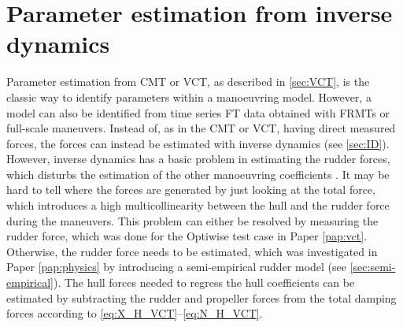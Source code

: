 \section{Parameter estimation from inverse dynamics} \label{sec:IDR}
Parameter estimation from CMT or VCT, as described in \autoref{sec:VCT}, is the classic way to identify parameters within a manoeuvring model. However, a model can also be identified from time series FT data obtained with FRMTs or full-scale maneuvers. Instead of, as in the CMT or VCT, having direct measured forces, the forces can instead be estimated with inverse dynamics (see \autoref{sec:ID}). However, inverse dynamics has a basic problem in estimating the rudder forces, which disturbs the estimation of the other manoeuvring coefficients \cite{arakiEstimatingManeuveringCoefficients2012}. It may be hard to tell where the forces are generated by just looking at the total force, which introduces a high multicollinearity between the hull and the rudder force during the maneuvers.
This problem can either be resolved by measuring the rudder force, which was done for the Optiwise test case in Paper \ref{pap:vct}. Otherwise, the rudder force needs to be estimated, which was investigated in Paper \ref{pap:physics} by introducing a semi-empirical rudder model (see \autoref{sec:semi-empirical}). The hull forces needed to regress the hull coefficients can be estimated by subtracting the rudder and propeller forces from the total damping forces according to \autoref{eq:X_H_VCT}--\autoref{eq:N_H_VCT}.



